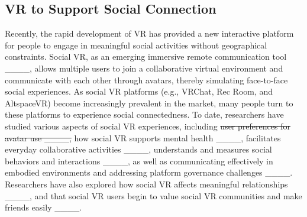 \subsection{VR to Support Social Connection}

Recently, the rapid development of VR has provided a new interactive platform for people to engage in meaningful social activities without geographical constraints. Social VR, as an emerging immersive remote communication tool ____, allows multiple users to join a collaborative virtual environment and communicate with each other through avatars, thereby simulating face-to-face social experiences. As social VR platforms (e.g., VRChat, Rec Room, and AltspaceVR) become increasingly prevalent in the market, many people turn to these platforms to experience social connectedness. 
To date, researchers have studied various aspects of social VR experiences, including \sout{user preferences for avatar use ____,} how social VR supports mental health ____, facilitates everyday collaborative activities ____, understands and measures social behaviors and interactions ____, as well as communicating effectively in embodied environments and addressing platform governance challenges ____. Researchers have also explored how social VR affects meaningful relationships ____, and that social VR users begin to value social VR communities and make friends easily ____.


